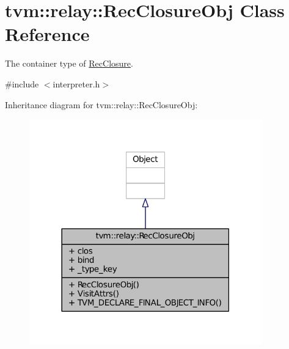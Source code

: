 \hypertarget{classtvm_1_1relay_1_1RecClosureObj}{}\section{tvm\+:\+:relay\+:\+:Rec\+Closure\+Obj Class Reference}
\label{classtvm_1_1relay_1_1RecClosureObj}


The container type of \hyperlink{classtvm_1_1relay_1_1RecClosure}{Rec\+Closure}.  




{\ttfamily \#include $<$interpreter.\+h$>$}



Inheritance diagram for tvm\+:\+:relay\+:\+:Rec\+Closure\+Obj\+:
\nopagebreak
\begin{figure}[H]
\begin{center}
\leavevmode
\includegraphics[width=285pt]{classtvm_1_1relay_1_1RecClosureObj__inherit__graph}
\end{center}
\end{figure}


